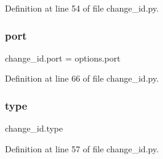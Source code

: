 Definition at line 54 of file change\+\_\+id.\+py.

\mbox{\label{namespacechange__id_ae15063b69d5d5964211d74be8f9a57d9}} 
\subsubsection{\texorpdfstring{port}{port}}
{\footnotesize\ttfamily change\+\_\+id.\+port = options.\+port}



Definition at line 66 of file change\+\_\+id.\+py.

\mbox{\label{namespacechange__id_a95d1f658dfc0b7ac3254fb7903129859}} 
\subsubsection{\texorpdfstring{type}{type}}
{\footnotesize\ttfamily change\+\_\+id.\+type}



Definition at line 57 of file change\+\_\+id.\+py.

